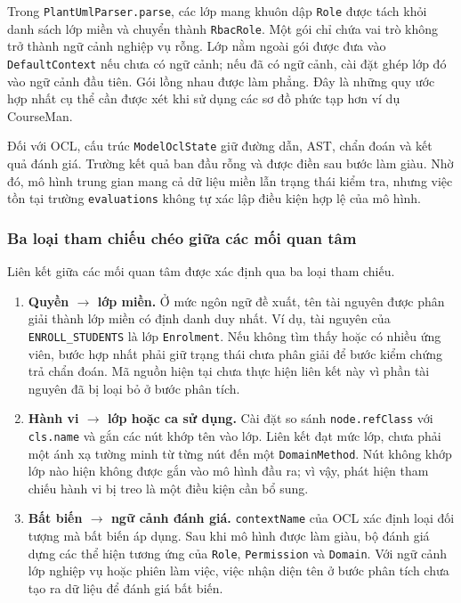 Trong \texttt{PlantUmlParser.parse}, các lớp mang khuôn dập \texttt{Role} được tách khỏi danh sách lớp miền và chuyển thành \texttt{RbacRole}. Một gói chỉ chứa vai trò không trở thành ngữ cảnh nghiệp vụ rỗng. Lớp nằm ngoài gói được đưa vào \texttt{DefaultContext} nếu chưa có ngữ cảnh; nếu đã có ngữ cảnh, cài đặt ghép lớp đó vào ngữ cảnh đầu tiên. Gói lồng nhau được làm phẳng. Đây là những quy ước hợp nhất cụ thể cần được xét khi sử dụng các sơ đồ phức tạp hơn ví dụ CourseMan.

Đối với OCL, cấu trúc \texttt{ModelOclState} giữ đường dẫn, AST, chẩn đoán và kết quả đánh giá. Trường kết quả ban đầu rỗng và được điền sau bước làm giàu. Nhờ đó, mô hình trung gian mang cả dữ liệu miền lẫn trạng thái kiểm tra, nhưng việc tồn tại trường \texttt{evaluations} không tự xác lập điều kiện hợp lệ của mô hình.

\subsubsection{Ba loại tham chiếu chéo giữa các mối quan tâm}

Liên kết giữa các mối quan tâm được xác định qua ba loại tham chiếu.

\begin{enumerate}[leftmargin=1.8em,itemsep=5pt]
  \item \textbf{Quyền $\to$ lớp miền.} Ở mức ngôn ngữ đề xuất, tên tài nguyên được phân giải thành lớp miền có định danh duy nhất. Ví dụ, tài nguyên của \texttt{ENROLL\_STUDENTS} là lớp \texttt{Enrolment}. Nếu không tìm thấy hoặc có nhiều ứng viên, bước hợp nhất phải giữ trạng thái chưa phân giải để bước kiểm chứng trả chẩn đoán. Mã nguồn hiện tại chưa thực hiện liên kết này vì phần tài nguyên đã bị loại bỏ ở bước phân tích.
  \item \textbf{Hành vi $\to$ lớp hoặc ca sử dụng.} Cài đặt so sánh \texttt{node.refClass} với \texttt{cls.name} và gắn các nút khớp tên vào lớp. Liên kết đạt mức lớp, chưa phải một ánh xạ tường minh từ từng nút đến một \texttt{DomainMethod}. Nút không khớp lớp nào hiện không được gắn vào mô hình đầu ra; vì vậy, phát hiện tham chiếu hành vi bị treo là một điều kiện cần bổ sung.
  \item \textbf{Bất biến $\to$ ngữ cảnh đánh giá.} \texttt{contextName} của OCL xác định loại đối tượng mà bất biến áp dụng. Sau khi mô hình được làm giàu, bộ đánh giá dựng các thể hiện tương ứng của \texttt{Role}, \texttt{Permission} và \texttt{Domain}. Với ngữ cảnh lớp nghiệp vụ hoặc phiên làm việc, việc nhận diện tên ở bước phân tích chưa tạo ra dữ liệu để đánh giá bất biến.
\end{enumerate}

